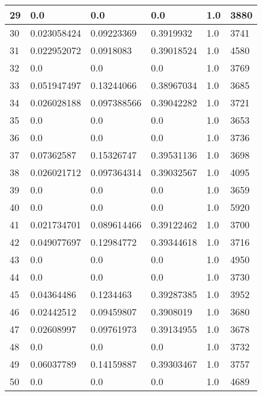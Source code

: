 \begin{longtable}{|l|l|l|l|l|l|}
29 & 0.0 & 0.0 & 0.0 & 1.0 & 3880 \\ \hline 
30 & 0.023058424 & 0.09223369 & 0.3919932 & 1.0 & 3741 \\ \hline 
31 & 0.022952072 & 0.0918083 & 0.39018524 & 1.0 & 4580 \\ \hline 
32 & 0.0 & 0.0 & 0.0 & 1.0 & 3769 \\ \hline 
33 & 0.051947497 & 0.13244066 & 0.38967034 & 1.0 & 3685 \\ \hline 
34 & 0.026028188 & 0.097388566 & 0.39042282 & 1.0 & 3721 \\ \hline 
35 & 0.0 & 0.0 & 0.0 & 1.0 & 3653 \\ \hline 
36 & 0.0 & 0.0 & 0.0 & 1.0 & 3736 \\ \hline 
37 & 0.07362587 & 0.15326747 & 0.39531136 & 1.0 & 3698 \\ \hline 
38 & 0.026021712 & 0.097364314 & 0.39032567 & 1.0 & 4095 \\ \hline 
39 & 0.0 & 0.0 & 0.0 & 1.0 & 3659 \\ \hline 
40 & 0.0 & 0.0 & 0.0 & 1.0 & 5920 \\ \hline 
41 & 0.021734701 & 0.089614466 & 0.39122462 & 1.0 & 3700 \\ \hline 
42 & 0.049077697 & 0.12984772 & 0.39344618 & 1.0 & 3716 \\ \hline 
43 & 0.0 & 0.0 & 0.0 & 1.0 & 4950 \\ \hline 
44 & 0.0 & 0.0 & 0.0 & 1.0 & 3730 \\ \hline 
45 & 0.04364486 & 0.1234463 & 0.39287385 & 1.0 & 3952 \\ \hline 
46 & 0.02442512 & 0.09459807 & 0.3908019 & 1.0 & 3680 \\ \hline 
47 & 0.02608997 & 0.09761973 & 0.39134955 & 1.0 & 3678 \\ \hline 
48 & 0.0 & 0.0 & 0.0 & 1.0 & 3732 \\ \hline 
49 & 0.06037789 & 0.14159887 & 0.39303467 & 1.0 & 3757 \\ \hline 
50 & 0.0 & 0.0 & 0.0 & 1.0 & 4689 \\ \hline 
\end{longtable}